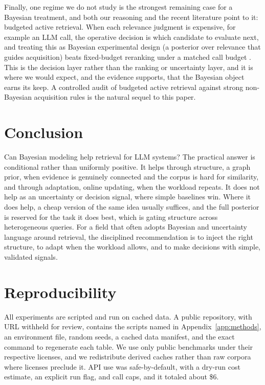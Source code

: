 \documentclass[11pt]{article}
\begin{document}
Finally, one regime we do not study is the strongest remaining case for a Bayesian treatment, and both
our reasoning and the recent literature point to it: budgeted active retrieval. When each relevance
judgment is expensive, for example an LLM call, the operative decision is which candidate to evaluate
next, and treating this as Bayesian experimental design (a posterior over relevance that guides
acquisition) beats fixed-budget reranking under a matched call budget \citep{bagel2026}. This is the
decision layer rather than the ranking or uncertainty layer, and it is where we would expect, and the
evidence supports, that the Bayesian object earns its keep. A controlled audit of budgeted active
retrieval against strong non-Bayesian acquisition rules is the natural sequel to this paper.

\section{Conclusion}

Can Bayesian modeling help retrieval for LLM systems? The practical answer is conditional rather than
uniformly positive. It helps through structure, a graph prior, when evidence is genuinely connected and
the corpus is hard for similarity, and through adaptation, online updating, when the workload repeats.
It does not help as an uncertainty or decision signal, where simple baselines win. Where it does help, a
cheap version of the same idea usually suffices, and the full posterior is reserved for the task it does
best, which is gating structure across heterogeneous queries. For a field that often adopts Bayesian and
uncertainty language around retrieval, the disciplined recommendation is to inject the right structure,
to adapt when the workload allows, and to make decisions with simple, validated signals.

\section*{Reproducibility}
All experiments are scripted and run on cached data. A public repository, with URL withheld for review,
contains the scripts named in Appendix~\ref{app:methods}, an environment file, random seeds, a cached
data manifest, and the exact command to regenerate each table. We use only public benchmarks under their
respective licenses, and we redistribute derived caches rather than raw corpora where licenses preclude
it. API use was safe-by-default, with a dry-run cost estimate, an explicit run flag, and call caps, and
it totaled about \$6.
\end{document}
